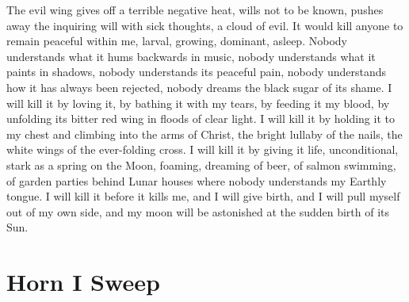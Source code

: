 \documentclass[english,11pt,letterpaper,onecolumn,parskip=full]{scrbook}
\begin{document}
\begin{poem}
\begin{stanza}
The evil wing gives off a terrible negative heat, wills not to be known, pushes away the inquiring will with sick thoughts, a cloud of evil.\verseline
It would kill anyone to remain peaceful within me, larval, growing, dominant, asleep.\verseline
Nobody understands what it hums backwards in music, nobody understands what it paints in shadows, nobody understands its peaceful pain, nobody understands how it has always been rejected, nobody dreams the black sugar of its shame.\verseline
I will kill it by loving it, by bathing it with my tears, by feeding it my blood, by unfolding its bitter red wing in floods of clear light.\verseline
I will kill it by holding it to my chest and climbing into the arms of Christ, the bright lullaby of the nails, the white wings of the ever-folding cross.\verseline
I will kill it by giving it life, unconditional, stark as a spring on the Moon, foaming, dreaming of beer, of salmon swimming, of garden parties behind Lunar houses where nobody understands my Earthly tongue.\verseline
I will kill it before it kills me, and I will give birth, and I will pull myself out of my own side, and my moon will be astonished at the sudden birth of its Sun.
\end{stanza}
\end{poem}

\newpage
\section{Horn I Sweep}
\end{document}
